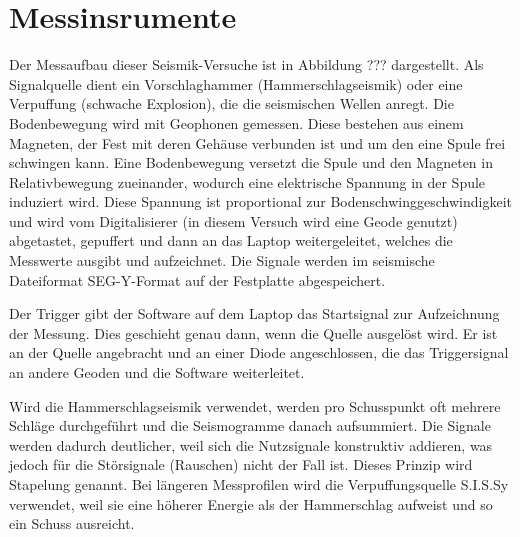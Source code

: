 \section{Messinsrumente}

Der Messaufbau dieser Seismik-Versuche ist in Abbildung ??? dargestellt. Als Signalquelle dient ein Vorschlaghammer (Hammerschlagseismik) oder eine Verpuffung (schwache Explosion), die die seismischen Wellen anregt. Die Bodenbewegung wird mit Geophonen gemessen. Diese bestehen aus einem Magneten, der Fest mit deren Gehäuse verbunden ist und um den eine Spule frei schwingen kann. Eine Bodenbewegung versetzt die Spule und den Magneten in Relativbewegung zueinander, wodurch eine elektrische Spannung in der Spule induziert wird. Diese Spannung ist proportional zur Bodenschwinggeschwindigkeit und wird vom Digitalisierer (in diesem Versuch wird eine Geode genutzt) abgetastet, gepuffert und dann an das Laptop weitergeleitet, welches die Messwerte ausgibt und aufzeichnet. Die Signale werden im seismische Dateiformat SEG-Y-Format auf der Festplatte abgespeichert.

Der Trigger gibt der Software auf dem Laptop das Startsignal zur Aufzeichnung der Messung. Dies geschieht genau dann, wenn die Quelle ausgelöst wird. Er ist an der Quelle angebracht und an einer Diode angeschlossen, die das Triggersignal an andere Geoden und die Software weiterleitet.  

Wird die Hammerschlagseismik verwendet, werden pro Schusspunkt oft mehrere Schläge durchgeführt und die Seismogramme danach aufsummiert. Die Signale werden dadurch deutlicher, weil sich die Nutzsignale konstruktiv addieren, was jedoch für die Störsignale (Rauschen) nicht der Fall ist. Dieses Prinzip wird Stapelung genannt. Bei längeren Messprofilen wird die Verpuffungsquelle S.I.S.Sy verwendet, weil sie eine höherer Energie als der Hammerschlag aufweist und so ein Schuss ausreicht.
